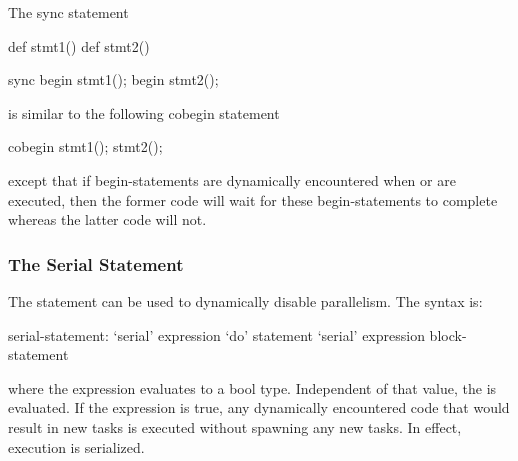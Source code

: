 \begin{example}
The sync statement
\begin{chapelpre}
def stmt1() { }
def stmt2() { }
\end{chapelpre}
\begin{chapel}
sync {
  begin stmt1();
  begin stmt2();
}
\end{chapel}
is similar to the following cobegin statement
\begin{chapel}
cobegin {
  stmt1();
  stmt2();
}
\end{chapel}
\begin{chapeloutput}
\end{chapeloutput}
except that if begin-statements are dynamically encountered
when  or  are executed, then the former
code will wait for these begin-statements to complete whereas the
latter code will not.
\end{example}

\subsubsection{The Serial Statement}
\label{Serial}

The  statement can be used to dynamically disable
parallelism.  The syntax is:
\begin{syntax}
serial-statement:
  `serial' expression `do' statement
  `serial' expression block-statement
\end{syntax}
where the expression evaluates to a bool type.  Independent of that
value, the  is evaluated. If the expression is true,
any dynamically encountered code that would result in new tasks is
executed without spawning any new tasks.  In effect, execution is
serialized.


